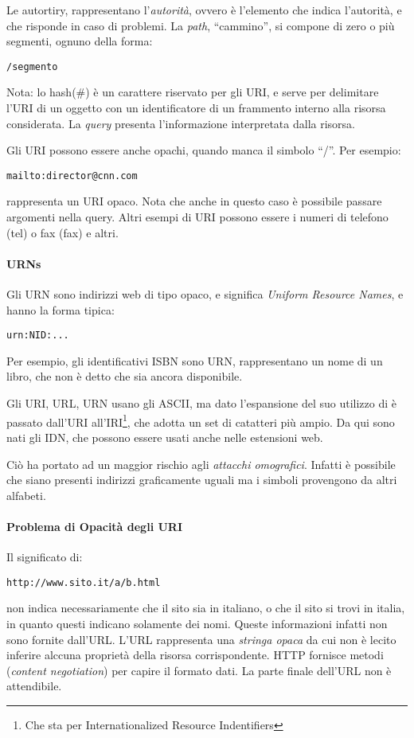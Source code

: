 Le autortiry, rappresentano l'\textit{autorit\`a}, ovvero \`e l'elemento che indica l'autorit\`a, e che risponde in caso di problemi. La \textit{path}, ``cammino'', si compone di zero o pi\`u segmenti, ognuno della forma:
\begin{verbatim}
/segmento
\end{verbatim}
Nota: lo hash(\#) \`e un carattere riservato per gli URI, e serve per delimitare l'URI di un oggetto con un identificatore di un frammento interno alla risorsa considerata.
La \textit{query} presenta l'informazione interpretata dalla risorsa.

Gli URI possono essere anche opachi, quando manca il simbolo ``/''. Per esempio:
\begin{verbatim}
mailto:director@cnn.com
\end{verbatim}
rappresenta un URI opaco. Nota che anche in questo caso \`e possibile passare argomenti nella query. Altri esempi di URI possono essere i numeri di telefono (tel) o fax (fax) e altri.

\paragraph*{URNs}Gli URN sono indirizzi web di tipo opaco, e significa \textit{Uniform Resource Names}, e hanno la forma tipica:
\begin{verbatim}
urn:NID:...
\end{verbatim}
Per esempio, gli identificativi ISBN sono URN, rappresentano un nome di un libro, che non \`e detto che sia ancora disponibile. \newline


Gli URI, URL, URN usano gli ASCII, ma dato l'espansione del suo utilizzo di \`e passato dall'URI all'IRI\footnote{Che sta per Internationalized Resource Indentifiers}, che adotta un set di catatteri pi\`u ampio. Da qui sono nati gli IDN, che possono essere usati anche nelle estensioni web.

Ci\`o ha portato ad un maggior rischio agli \textit{attacchi omografici}. Infatti \`e possibile che siano presenti indirizzi graficamente uguali ma i simboli provengono da altri alfabeti.

\paragraph*{Problema di Opacit\`a degli URI}Il significato di:
\begin{verbatim}
http://www.sito.it/a/b.html
\end{verbatim}
non indica necessariamente che il sito sia in italiano, o che il sito si trovi in italia, in quanto questi indicano solamente dei nomi. Queste informazioni infatti non sono fornite dall'URL. L'URL rappresenta una \textit{stringa opaca} da cui non \`e lecito inferire alccuna propriet\`a della risorsa corrispondente. HTTP fornisce metodi (\textit{content negotiation}) per capire il formato dati. La parte finale dell'URL non \`e attendibile.

